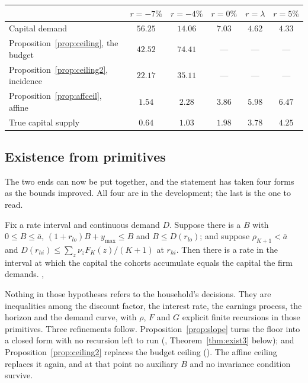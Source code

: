 \begingroup\small
\begin{center}
\begin{tabular}{@{}lccccc@{}}
\toprule
& $r=-7\%$ & $r=-4\%$ & $r=0\%$ & $r=\lambda$ & $r=5\%$\\
\midrule
Capital demand & $56.25$ & $14.06$ & $7.03$ & $4.62$ & $4.33$\\
Proposition~\ref{prop:ceiling}, the budget & $42.52$ & $74.41$ & --- & --- & ---\\
Proposition~\ref{prop:ceiling2}, incidence & $22.17$ & $35.11$ & --- & --- & ---\\
Proposition~\ref{prop:affceil}, affine & $1.54$ & $2.28$ & $3.86$ & $5.98$ & $6.47$\\
True capital supply & $0.64$ & $1.03$ & $1.98$ & $3.78$ & $4.25$\\
\bottomrule
\end{tabular}
\end{center}
\endgroup

\subsection{Existence from primitives}

The two ends can now be put together, and the statement has taken four forms as the bounds
improved. All four are in the development; the last is the one to read.

\begin{theorem}\label{thm:exist2}
Fix a rate interval and continuous demand $D$. Suppose there is a $B$ with $0\le B\le\bar a$,
$(1+r_{lo})B+y_{\max}\le B$ and $B\le D(r_{lo})$; and suppose $\rho_{K+1}<\bar a$ and
$D(r_{hi})\le\sum_z\nu_zF_K(z)/(K+1)$ at $r_{hi}$. Then there is a rate in the interval at which
the capital the cohorts accumulate equals the capital the firm demands.
,
\end{theorem}

Nothing in those hypotheses refers to the household's decisions. They are inequalities among the
discount factor, the interest rate, the earnings process, the horizon and the demand curve, with
$\rho$, $F$ and $G$ explicit finite recursions in those primitives. Three refinements follow.
Proposition~\ref{prop:slope} turns the floor into a closed form with no recursion left to run
(, Theorem~\ref{thm:exist3} below);
and Proposition~\ref{prop:ceiling2} replaces the budget ceiling
(). The affine ceiling replaces it
again, and at that point no auxiliary $B$ and no invariance condition survive.

